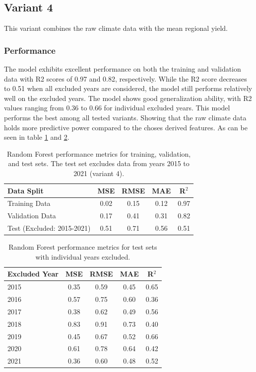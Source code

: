 \documentclass{article}
\begin{document}
\subsection{Variant 4}
This variant combines the raw climate data with the mean regional yield.
\subsubsection{Performance}
The model exhibits excellent performance on both the training and validation data with R2 scores of 0.97 and 0.82, respectively. While the R2 score decreases to 0.51 when all excluded years are considered, the model still performs relatively well on the excluded years.  The model shows good generalization ability, with R2 values ranging from 0.36 to 0.66 for individual excluded years.
This model performs the best among all tested variants. Showing that the raw climate data holds more predictive power compared to the choses derived features.
As can be seen in table \ref{table:errors_on_datasets_variant_4} and \ref{table:errors_on_datasets_years_variant_4}.
\begin{table}[H]
	\centering
	\begin{tabular}{lcccc}
		\hline
		Data Split                 & MSE  & RMSE & MAE  & R$^2$ \\
		\hline
		Training Data              & 0.02 & 0.15 & 0.12 & 0.97  \\
		Validation Data            & 0.17 & 0.41 & 0.31 & 0.82  \\
		Test (Excluded: 2015-2021) & 0.51 & 0.71 & 0.56 & 0.51  \\
		\hline
	\end{tabular}
	\caption{\label{table:errors_on_datasets_variant_4} Random Forest performance metrics for training, validation, and test sets. The test set excludes data from years 2015 to 2021 (variant 4).}
\end{table}

\begin{table}[H]
	\centering
	\begin{tabular}{lcccc}
		\hline
		Excluded Year & MSE  & RMSE & MAE  & R$^2$ \\
		\hline
		2015          & 0.35 & 0.59 & 0.45 & 0.65  \\
		2016          & 0.57 & 0.75 & 0.60 & 0.36  \\
		2017          & 0.38 & 0.62 & 0.49 & 0.56  \\
		2018          & 0.83 & 0.91 & 0.73 & 0.40  \\
		2019          & 0.45 & 0.67 & 0.52 & 0.66  \\
		2020          & 0.61 & 0.78 & 0.64 & 0.42  \\
		2021          & 0.36 & 0.60 & 0.48 & 0.52  \\
		\hline
	\end{tabular}
	\caption{\label{table:errors_on_datasets_years_variant_4} Random Forest performance metrics for test sets with individual years excluded.}
\end{table}
\end{document}
